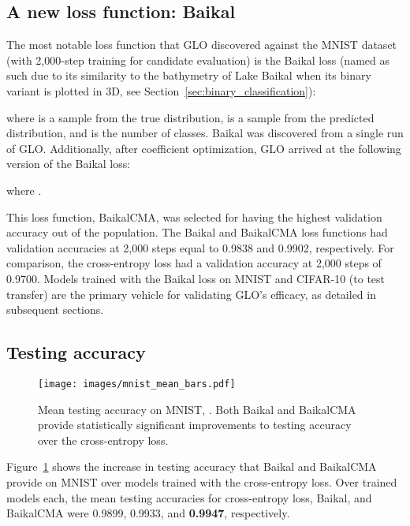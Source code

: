 \documentclass[conference]{IEEEtran}
\newcommand{\TECH}{GLO\xspace}
\begin{document}
\subsection{A new loss function: Baikal}





The most notable loss function that \TECH discovered against the MNIST dataset (with 2,000-step training for candidate evaluation) is the Baikal loss (named as such due to its similarity to the bathymetry of Lake Baikal when its binary variant is plotted in 3D, see Section~\ref{sec:binary_classification}):

where  is a sample from the true distribution,  is a sample from the predicted distribution, and  is the number of classes. Baikal was discovered from a single run of \TECH. Additionally, after coefficient optimization, \TECH arrived at the following version of the Baikal loss:

where .




This loss function, BaikalCMA, was selected for having the highest validation accuracy out of the population. The Baikal and BaikalCMA loss functions had validation accuracies at 2,000 steps equal to 0.9838 and 0.9902, respectively. For comparison, the cross-entropy loss had a validation accuracy at 2,000 steps of 0.9700. Models trained with the Baikal loss on MNIST and CIFAR-10 (to test transfer) are the primary vehicle for validating GLO's efficacy, as detailed in subsequent sections. 





\subsection{Testing accuracy}




\begin{figure}
  \centering
\texttt{[image: images/mnist\_mean\_bars.pdf]}
  \caption{Mean testing accuracy on MNIST, . Both Baikal and BaikalCMA provide statistically significant improvements to testing accuracy over the cross-entropy loss.}
  \label{fig:mean_accuracy}
\end{figure}

Figure~\ref{fig:mean_accuracy} shows the increase in testing accuracy that Baikal and BaikalCMA provide on MNIST over models trained with the cross-entropy loss. Over  trained models each, the mean testing accuracies for cross-entropy loss, Baikal, and BaikalCMA were 0.9899, 0.9933, and \textbf{0.9947}, respectively.
\end{document}
